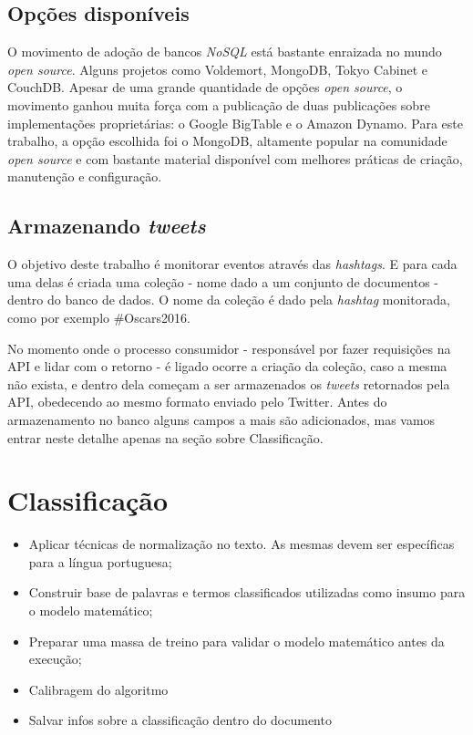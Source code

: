 \subsection{Opções disponíveis}
O movimento de adoção de bancos \textit{NoSQL} está bastante enraizada no mundo \textit{open source}. Alguns projetos como Voldemort\cite{voldemortproject}, MongoDB\cite{mongodb}, Tokyo Cabinet\cite{tokyocabinet} e CouchDB\cite{couchdb}. Apesar de uma grande quantidade de opções \textit{open source}, o movimento ganhou muita força com a publicação de duas publicações sobre implementações proprietárias: o Google BigTable\cite{chang2008bigtable} e o Amazon Dynamo\cite{decandia2007dynamo}. Para este trabalho, a opção escolhida foi o MongoDB, altamente popular na comunidade \textit{open source} e com bastante material disponível com melhores práticas de criação, manutenção e configuração.

\subsection{Armazenando \textit{tweets}}
O objetivo deste trabalho é monitorar eventos através das \textit{hashtags}. E para cada uma delas é criada uma coleção - nome dado a um conjunto de documentos - dentro do banco de dados. O nome da coleção é dado pela \textit{hashtag} monitorada, como por exemplo \mbox{\#Oscars2016}.

No momento onde o processo consumidor - responsável por fazer requisições na API e lidar com o retorno - é ligado ocorre a criação da coleção, caso a mesma não exista, e dentro dela começam a ser armazenados os \textit{tweets} retornados pela API, obedecendo ao mesmo formato enviado pelo Twitter. Antes do armazenamento no banco alguns campos a mais são adicionados, mas vamos entrar neste detalhe apenas na seção sobre Classificação.

\section{Classificação}
\begin{itemize}
	\item Aplicar técnicas de normalização no texto. As mesmas devem ser específicas para a língua portuguesa;
	\item Construir base de palavras e termos classificados utilizadas como insumo para o modelo matemático;
	\item Preparar uma massa de treino para validar o modelo matemático antes da execução;
	\item Calibragem do algoritmo
	\item Salvar infos sobre a classificação dentro do documento
\end{itemize}


